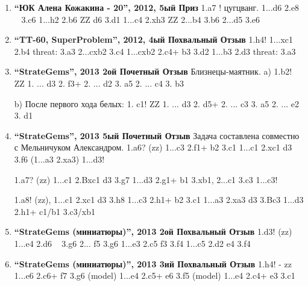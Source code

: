 \begin{enumerate}
\item \textbf{ ``ЮК Алена Кожакина - 20'', 2012, 5ый Приз } 1.\knight{}a7 ! цугцванг.
    1...\king{}d6 2.\rook{}e8 ~ 3.\queen{}c6 \mate{} 
    1...h2 2.\bishop{}b6 ZZ \king{}d6 3.\queen{}d1 \mate{} 
    1...\king{}c4 2.\queen{}xh3 ZZ
            2...\king{}b4 3.\bishop{}b6 \mate{} 
            2...\king{}d5 3.\queen{}e6 \mate{}

\item \textbf{ ``TT-60, SuperProblem'', 2012, 4ый Похвальный Отзыв} 1.\rook{}h4! 
1...\king{}xc1 2.\rook{}b4 threat: 3.\knight{}a3\mate{} 
  2...cxb2 3.\rook{}c4\mate{} 
1...cxb2 2.\rook{}c4+ \king{}b3 3.\knight{}d2\mate{} 
1...\king{}b3 2.\king{}d3 threat: 3.\rook{}a3\mate{}

\item \textbf{ ``StrateGems'', 2013 2ой Почетный Отзыв } Близнецы-маятник. a) 1.\king{}b2! ZZ
  1. ... \king{}d3 2. \queen{}f3+
   2. ... \king{}d2 3. \bishop{}a5\mate{}
   2. ... \king{}c4 3. \queen{}b3\mate{}

b) После первого хода белых: 1. \king{}c1! ZZ
 1. ... \king{}d3 2. \queen{}d5+
  2. ... \king{}c3 3. \bishop{}a5\mate{}
  2. ... \king{}e2 3. \queen{}d1\mate{}

\item \textbf{ ``StrateGems'', 2013 5ый Почетный Отзыв } Задача составлена совместно с Мельничуком Александром.
1.\queen{}a6? (zz)
1...\bishop{}c3 2.\queen{}f1+ \king{}b2 3.\queen{}c1\mate{}
1...\bishop{}c1 2.\bishop{}xc1 d3 3.\queen{}f6\mate{}
(1...\bishop{}a3 2.\queen{}xa3)
1...d3!

1.\queen{}a7? (zz)
1...\bishop{}c1 2.Bxc1 d3 3.\queen{}g7\mate{}
1...d3 2.\queen{}g1+ \bishop{}b1 3.\queen{}xb1\mate{}, 2...\bishop{}c1 3.\bishop{}c3\mate{}
1...\bishop{}c3!

1.\queen{}a8! (zz), 
1...\bishop{}c1  2.\bishop{}xc1  d3  3.\queen{}h8\mate{}
1...\bishop{}c3  2.\queen{}h1+  \king{}b2  3.\queen{}c1\mate{}
1...\bishop{}a3  2.\queen{}xa3  d3  3.Bc3\mate{}
1...d3 2.\queen{}h1+ \bishop{}c1/\bishop{}b1 3.\bishop{}c3/\queen{}xb1\mate{}

\item \textbf{ ``StrateGems (миниатюры)'', 2013 2ой Похвальный Отзыв } 1.\knight{}d3! (zz)
  1...\king{}e4 2.\queen{}d6 ~ 3.\queen{}g6\mate{}
      2... \king{}f5 3.\queen{}g6\mate{}
  1...\king{}e3 2.c5 \king{}f3 3.\queen{}f4\mate{}
  1...c5 2.\queen{}d2 \king{}e4 3.\queen{}f4\mate{}

\item \textbf{ ``StrateGems (миниатюры)'', 2013 3ий Похвальный Отзыв } 1.\knight{}h4! - zz
  1...\king{}e6 2.\queen{}c6+ \king{}f7 3.\queen{}g6\mate{}  (model)
  1...e4 2.\queen{}c5+ \king{}e6 3.\queen{}f5\mate{}  (model)
  1...\king{}e4 2.\queen{}c4+ \king{}e3 3.\bishop{}c1\mate{}


\end{enumerate}

